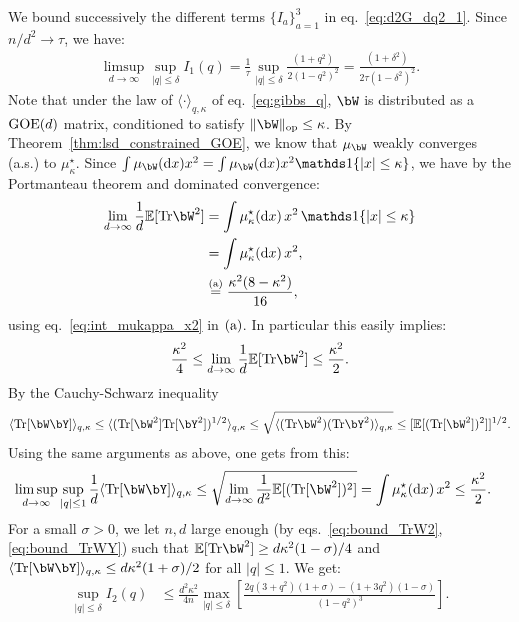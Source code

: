 We bound successively the different terms $\{I_a\}_{a=1}^3$ in eq.~\eqref{eq:d2G_dq2_1}. 
Since $n/d^2 \to \tau$, we have:
\begin{align}\label{eq:ub_I1}
   \limsup_{d \to \infty}\sup_{|q| \leq \delta} I_1(q) = \frac{1}{\tau} \sup_{|q| \leq \delta }\frac{(1+q^2)}{2(1-q^2)^2} 
    = \frac{(1+\delta^2)}{2 \tau(1-\delta^2)^2}.
\end{align}
Note that under the law of $\langle \cdot \rangle_{q,\kappa}$ of eq.~\eqref{eq:gibbs_q},
$\bW$ is distributed as a $\mathrm{GOE}(d)$ matrix, conditioned to satisfy $\|\bW\|_\op \leq \kappa$.
By Theorem~\ref{thm:lsd_constrained_GOE}, we know that $\mu_\bW$ weakly converges (a.s.) to $\mu_\kappa^\star$.
Since $\int \mu_\bW(\rd x) x^2 = \int \mu_\bW(\rd x) x^2 \indi\{|x| \leq \kappa\}$, we have by the Portmanteau theorem 
and dominated convergence: 
\begin{align*}
    \lim_{d \to \infty} \frac{1}{d}\EE[\Tr \bW^2] &= \int \mu_\kappa^\star(\rd x) \, x^2 \, \indi\{|x| \leq \kappa\} \\ 
    &= \int \mu_\kappa^\star(\rd x) \, x^2, \\
    &\aeq \frac{\kappa^2 (8-\kappa^2)}{16},
\end{align*}
using eq.~\eqref{eq:int_mukappa_x2} in $(\rm a)$.
In particular this easily implies: 
\begin{align}\label{eq:bound_TrW2}
   \frac{\kappa^2}{4} \leq \lim_{d \to \infty} \frac{1}{d}\EE[\Tr \bW^2] \leq \frac{\kappa^2}{2}.
\end{align}
By the Cauchy-Schwarz inequality 
\begin{equation*}
\langle \Tr[\bW \bY] \rangle_{q,\kappa} \leq \langle(\Tr[\bW^2] \Tr[\bY^2])^{1/2} \rangle_{q,\kappa}\leq \sqrt{\langle(\Tr \bW^2)(\Tr \bY^2)\rangle_{q,\kappa}} \leq [\EE[(\Tr[\bW^2])^2]]^{1/2}.
\end{equation*}
Using the same arguments as above, one gets from this:
\begin{align}\label{eq:bound_TrWY}
    \limsup_{d \to \infty} \sup_{|q| \leq 1} \frac{1}{d} \langle \Tr[\bW \bY] \rangle_{q,\kappa} \leq \sqrt{\lim_{d \to \infty} \frac{1}{d^2}\EE[(\Tr[\bW^2])^2]} &=\int \mu_\kappa^\star(\rd x) \, x^2 \leq \frac{\kappa^2}{2}.
\end{align}
For a small $\sigma > 0$, we let $n, d$ large enough (by eqs.~\eqref{eq:bound_TrW2},\eqref{eq:bound_TrWY}) such that
$\EE[\Tr\bW^2] \geq d \kappa^2 (1-\sigma) / 4$ 
and $\langle \Tr[\bW \bY] \rangle_{q,\kappa} \leq d \kappa^2 (1+\sigma) / 2$ for all $|q| \leq 1$.
We get: 
\begin{align*}
    \sup_{|q| \leq \delta} I_2(q) &\leq \frac{d^2 \kappa^2}{4n} \max_{|q| \leq \delta }\left[\frac{2q(3+q^2) (1+\sigma) - (1+3q^2) (1-\sigma)}{(1-q^2)^3}\right].
\end{align*}
